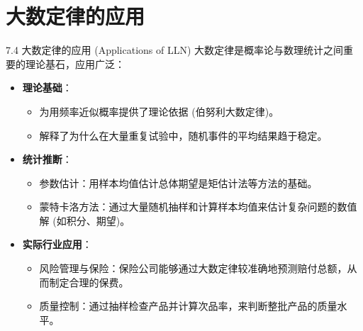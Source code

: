 \documentclass[UTF8]{beamer} %
\begin{document}
\section{大数定律的应用}
\begin{frame}{7.4 大数定律的应用 (Applications of LLN)}
    大数定律是概率论与数理统计之间重要的理论基石，应用广泛：
    \begin{itemize}
        \item \textbf{理论基础}：
            \begin{itemize}
                \item 为用\alert{频率近似概率}提供了理论依据 (伯努利大数定律)。
                \item 解释了为什么在大量重复试验中，随机事件的\alert{平均结果趋于稳定}。
            \end{itemize}
        \pause
        \item \textbf{统计推断}：
            \begin{itemize}
                \item \alert{参数估计}：用样本均值估计总体期望是矩估计法等方法的基础。
                \item \alert{蒙特卡洛方法}：通过大量随机抽样和计算样本均值来估计复杂问题的数值解 (如积分、期望)。
            \end{itemize}
        \pause
        \item \textbf{实际行业应用}：
            \begin{itemize}
                \item \alert{风险管理与保险}：保险公司能够通过大数定律较准确地预测赔付总额，从而制定合理的保费。
                \item \alert{质量控制}：通过抽样检查产品并计算次品率，来判断整批产品的质量水平。
            \end{itemize}
    \end{itemize}
\end{frame}
\end{document}
